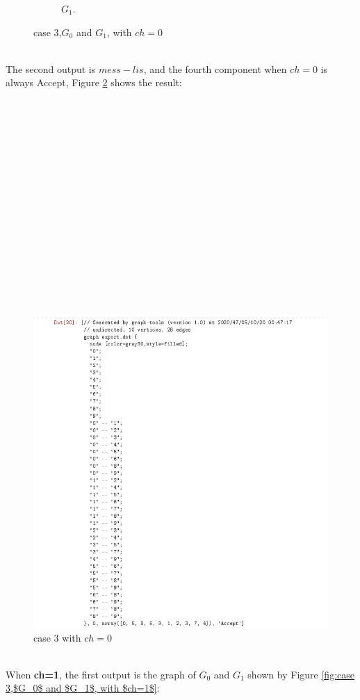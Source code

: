 \documentclass[12pt,a4paper]{article}
\begin{document}
\begin{itemize}
\begin{figure}[h!]
\begin{subfigure}[b]{.45\linewidth}
		\caption{$G_1$.}
	\end{subfigure}
	\caption{case 3,$G_0$ and $G_1$, with $ch=0$}
	\label{fig:case 3,$G_0$ and $G_1$, with $ch=0$}
\end{figure}\\
The second output is $mess-lis$, and the fourth component when $ch=0$ is always Accept, Figure \ref{fig:3-19} shows the result:\\
\\
\\
\\
\\
\\
\\
\\
\\
\\
\\
\\
\\
\\
\\
\\
\\
\begin{figure}[h]
\centering
\includegraphics[width=0.85\linewidth]{3-19}
\caption{case 3 with $ch=0$}
\label{fig:3-19}
\end{figure}\\
 When \textbf{ch=1}, the first output is the graph of $G_0$ and $G_1$ shown by Figure \ref{fig:case 3,$G_0$ and $G_1$, with $ch=1$}:\\

\end{itemize}
\end{document}
